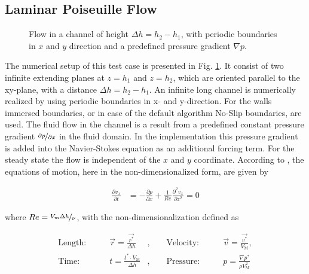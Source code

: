 \subsection{Laminar Poiseuille Flow}
\label{vali:sec_lpflow_setup}

\begin{figure}[!bp]
  \begin{minipage}[c]{0.6\textwidth}
      \centering
  \end{minipage}
  \begin{minipage}[c]{0.3\textwidth}
      \caption{Flow in a channel of height $\Delta h = h_2 - h_1$, with periodic boundaries in $x$ and $y$ direction and
       a predefined pressure gradient $\nabla p$.
      \label{validation:setup_pf}
      }
  \end{minipage}
\end{figure}

The numerical setup of this test case is presented in Fig. \ref{validation:setup_pf}.
It consist of two infinite extending  planes at $z=h_1$ and $z=h_2$, which are oriented
parallel to the xy-plane, with a distance $\Delta h = h_2 - h_1$.
An infinite long channel is numerically realized by using periodic boundaries in x- and y-direction.
For the walls immersed boundaries, or in case of the default algorithm No-Slip boundaries, are used.
The fluid flow in the channel is a result from a predefined constant pressure gradient $\nicefrac{\partial p}{\partial x}$
in the fluid domain.
In the implementation this pressure gradient is added into the Navier-Stokes equation as an additional forcing term.
For the steady state the flow is independent of the $x$ and $y$ coordinate.
According to \citep{Kundu2012}, the equations of motion, here in the non-dimensionalized form, are given by

\begin{align}
    \label{vali:pflow_navstok}
    \frac{\partial v_x}{\partial t} &= - \frac{\partial p}{\partial x}
     + \frac{1}{Re} \frac{\partial^2 v_x}{\partial z^2} = 0
\end{align}

where $Re = \nicefrac{V_{m}\Delta h}{\nu}$, with the non-dimensionalization defined as

\begin{align}
    \text{Length:}\qquad &  \vec{r} = \frac{\vec{r^*}}{\Delta h}  &,
    \qquad \text{Velocity:}\qquad& \vec{v} =  \frac{\vec{v^*}}{V_{\text{M}}},\\
    \text{Time:}  \qquad & t = \frac{t^* \cdot V_\text{M}}{\Delta h}&,
    \qquad  \text{Pressure:}\qquad & p = \frac{\nabla p^*}{\rho V_\text{M}^2}
\end{align}

